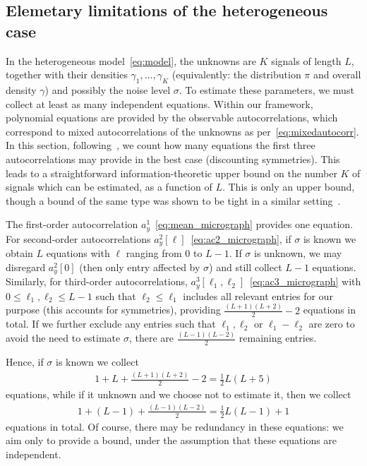\documentclass[12pt]{article}
\newcommand{\1}{\mathbf{1}}
\newcommand{\TODO}[1]{{\color{red}{[#1]}}}
\theoremstyle{plain}
\theoremstyle{definition}
\theoremstyle{remark}
\theoremstyle{plain}
\theoremstyle{remark}
\theoremstyle{plain}
\theoremstyle{plain}
\theoremstyle{plain}
\numberwithin{equation}{section}
\begin{document}
\subsection{Elemetary limitations of the heterogeneous case}
\label{sec:heterogeneity}

\TODO{Check and specify if this holds for both models}
\TODO{Did we define densities $\gamma_k$?}
\TODO{We write the section for the well-separated model, but it would be the same for the Poisson model}

In the heterogeneous model~\eqref{eq:model}, the unknowns are $K$ signals of length $L$, together with their densities $\gamma_1, \ldots, \gamma_K$ (equivalently: the distribution $\pi$ and overall density $\gamma$) and possibly the noise level $\sigma$. To estimate these parameters, we must collect at least as many independent equations. Within our framework, polynomial equations are provided by the observable autocorrelations, which correspond to mixed autocorrelations of the unknowns as per~\eqref{eq:mixedautocorr}. In this section, following~\cite{boumal2017heterogeneous}, we count how many equations the first three autocorrelations may provide in the best case (discounting symmetries). This leads to a straightforward information-theoretic upper bound on the number $K$ of signals which can be estimated, as a function of $L$. This is only an upper bound, though a bound of the same type was shown to be tight in a similar setting~\cite{bandeira2017estimation}.

The first-order autocorrelation $a_y^1$~\eqref{eq:mean_micrograph} provides one equation. For second-order autocorrelations $a_y^2[\ell]$~\eqref{eq:ac2_micrograph}, if $\sigma$ is known we obtain $L$ equations with $\ell$ ranging from 0 to $L-1$. If $\sigma$ is unknown, we may disregard $a_y^2[0]$ (then only entry affected by $\sigma$) and still collect $L-1$ equations. Similarly, for third-order autocorrelations, $a_y^3[\ell_1, \ell_2]$~\eqref{eq:ac3_micrograph} with $0 \leq \ell_1, \ell_2 \leq L-1$ such that $\ell_2 \leq \ell_1$ includes all relevant entries for our purpose (this accounts for symmetries), providing $\frac{(L+1)(L+2)}{2}-2$ equations in total. 
If we further exclude any entries such that $\ell_1, \ell_2$ or $\ell_1 - \ell_2$ are zero to avoid the need to estimate $\sigma$, there are $\frac{(L-1)(L-2)}{2}$ remaining entries.

Hence, if $\sigma$ is known we collect
\begin{align*}
	1 + L + \frac{(L+1)(L+2)}{2}-2 = \frac{1}{2} L (L+5)
\end{align*}
equations, while if it unknown and we choose not to estimate it, then we collect
\begin{align*}
	1 + (L-1) + \frac{(L-1)(L-2)}{2} = \frac{1}{2} L (L-1) + 1
\end{align*}
equations in total. Of course, there may be redundancy in these equations: we aim only to provide a bound, under the assumption that these equations are independent.
\end{document}
